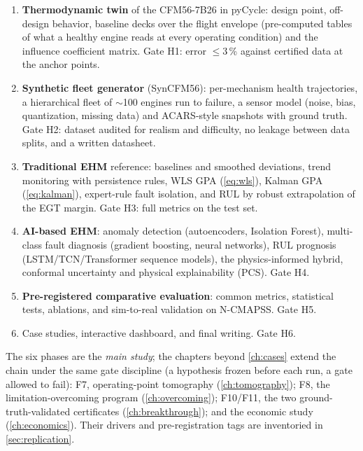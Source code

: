 \begin{enumerate}
  \item[\textbf{F1.}] \textbf{Thermodynamic twin} of the CFM56-7B26 in pyCycle: design point,
    off-design behavior, baseline decks over the flight envelope (pre-computed tables of what a
    healthy engine reads at every operating condition) and the influence coefficient matrix.
    Gate H1: error $\leq 3$\,\% against certified data at the anchor points.
  \item[\textbf{F2.}] \textbf{Synthetic fleet generator} (SynCFM56): per-mechanism health
    trajectories, a hierarchical fleet of $\sim$100 engines run to failure, a sensor model
    (noise, bias, quantization, missing data) and ACARS-style snapshots with ground truth.
    Gate H2: dataset audited for realism and difficulty, no leakage between data splits, and a
    written datasheet.
  \item[\textbf{F3.}] \textbf{Traditional EHM} reference: baselines and smoothed deviations,
    trend monitoring with persistence rules, WLS GPA (\cref{eq:wls}), Kalman GPA
    (\cref{eq:kalman}), expert-rule fault isolation, and RUL by robust extrapolation of the EGT
    margin. Gate H3: full metrics on the test set.
  \item[\textbf{F4.}] \textbf{AI-based EHM}: anomaly detection (autoencoders, Isolation
    Forest), multi-class fault diagnosis (gradient boosting, neural networks), RUL prognosis
    (LSTM/TCN/Transformer sequence models), the physics-informed hybrid, conformal uncertainty
    and physical explainability (PCS). Gate H4.
  \item[\textbf{F5.}] \textbf{Pre-registered comparative evaluation}: common metrics,
    statistical tests, ablations, and sim-to-real validation on N-CMAPSS. Gate H5.
  \item[\textbf{F6.}] Case studies, interactive dashboard, and final writing. Gate H6.
\end{enumerate}

The six phases are the \emph{main study}; the chapters beyond \cref{ch:cases} extend the
chain under the same gate discipline (a hypothesis frozen before each run, a gate allowed to
fail): F7, operating-point tomography (\cref{ch:tomography}); F8, the limitation-overcoming
program (\cref{ch:overcoming}); F10/F11, the two ground-truth-validated certificates
(\cref{ch:breakthrough}); and the economic study (\cref{ch:economics}). Their drivers and
pre-registration tags are inventoried in \cref{sec:replication}.

